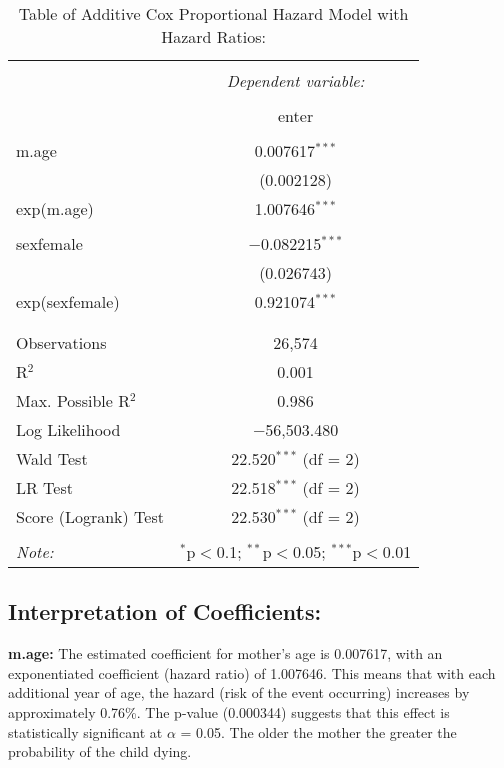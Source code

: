 \documentclass[12pt,letterpaper]{article}
\begin{document}
\begin{table}[!htbp] \centering 
	\caption{Table of Additive Cox Proportional Hazard Model with Hazard Ratios:} 
	\label{} 
	\begin{tabular}{@{\extracolsep{5pt}}lc} 
		\\[-1.8ex]\hline 
		\hline \\[-1.8ex] 
		& \multicolumn{1}{c}{\textit{Dependent variable:}} \\ 
		\cline{2-2} 
		\\[-1.8ex] & enter \\ 
		\hline \\[-1.8ex] 
		m.age &  0.007617$^{***}$ \\ 
		& (0.002128) \\ 
		exp(m.age) & 1.007646$^{***}$ \\ 
		& \\ 
		sexfemale & $-$0.082215$^{***}$ \\ 
		& (0.026743) \\ 
		exp(sexfemale) & 0.921074$^{***}$ \\ 
		& \\ 
		\hline \\[-1.8ex] 
		Observations & 26,574 \\ 
		R$^{2}$ & 0.001 \\ 
		Max. Possible R$^{2}$ & 0.986 \\ 
		Log Likelihood & $-$56,503.480 \\ 
		Wald Test & 22.520$^{***}$ (df = 2) \\ 
		LR Test & 22.518$^{***}$ (df = 2) \\ 
		Score (Logrank) Test & 22.530$^{***}$ (df = 2) \\ 
		\hline 
		\hline \\[-1.8ex] 
		\textit{Note:}  & \multicolumn{1}{r}{$^{*}$p$<$0.1; $^{**}$p$<$0.05; $^{***}$p$<$0.01} \\ 
	\end{tabular} 
\end{table}

\subsection*{Interpretation of Coefficients:}

\textbf{m.age:} The estimated coefficient for mother's age is 0.007617, with an exponentiated coefficient (hazard ratio) of 1.007646. This means that with each additional year of age, the hazard (risk of the event occurring) increases by approximately 0.76\%. The p-value (0.000344) suggests that this effect is statistically significant at $\alpha$ = 0.05. The older the mother the greater the probability of the child dying.
\end{document}
